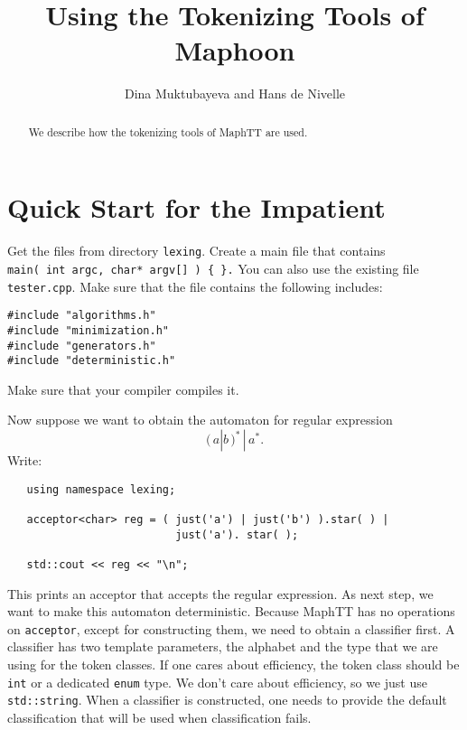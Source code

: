 \documentclass{article}
\title{Using the Tokenizing Tools of Maphoon}
\author{Dina Muktubayeva and Hans de Nivelle}
\begin{document}
\maketitle
\begin{abstract}
   We describe how the tokenizing tools of MaphTT are
   used. 
\end{abstract}

\section{Quick Start for the Impatient}

Get the files from directory \verb+lexing+.
Create a main file that contains \\
\verb+main( int argc, char* argv[] ) { }.+
You can also use the existing file \verb+tester.cpp+. 
Make sure that the file contains the following includes: 
\begin{verbatim}
#include "algorithms.h"
#include "minimization.h"
#include "generators.h"
#include "deterministic.h" \end{verbatim}
Make sure that your compiler compiles it. 

\noindent
Now suppose we want to obtain the automaton for
regular expression 
\[  (\, a|b \, )^{*} \, | \, a^{*}. \]
Write: 
\begin{verbatim}
   using namespace lexing; 

   acceptor<char> reg = ( just('a') | just('b') ).star( ) |
                          just('a'). star( );

   std::cout << reg << "\n"; \end{verbatim}
This prints an acceptor that accepts the regular expression. 
As next step, we want to make this automaton deterministic.
Because MaphTT has no operations on 
\verb+acceptor+, except for constructing them, 
we need to obtain a classifier first.
A classifier has two template parameters, the alphabet
and the type that we are using for the token classes.
If one cares about efficiency, the token class
should be \verb+int+ or a dedicated \verb+enum+ type.
We don't care about efficiency, so we just use
\verb+std::string+. When a classifier is constructed,
one needs to provide the default classification
that will be used when classification fails.
\end{document}
